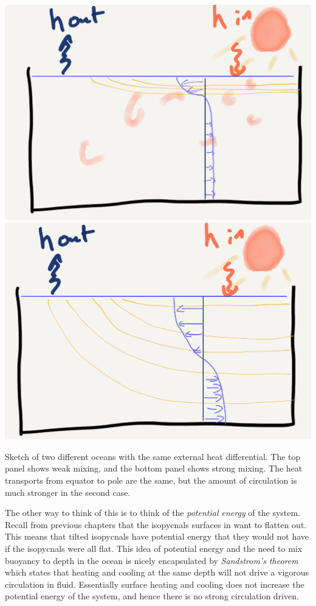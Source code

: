 \begin{marginfigure}
    \includegraphics{figs/WaterMasses/SketchWeakMix}
    \includegraphics{figs/WaterMasses/SketchStrongMix}
    \caption{Sketch of two different oceans with the same external heat differential.  The top panel shows weak mixing, and the bottom panel shows strong mixing.  The heat transports from equator to pole are the same, but the amount of circulation is much stronger in the second case.}
    \label{fig:SketchMixing}  
\end{marginfigure}

The other way to think of this is to think of the \emph{potential energy} of the system.  Recall from previous chapters that the isopycnals surfaces in  want to flatten out.  This means that tilted isopycnals have potential energy that they would not have if the isopycnals were all flat.  This idea of potential energy and the need to mix buoyancy to depth in the ocean is nicely encapsulated by \emph{Sandstrom's theorem} which states that heating and cooling at the same depth will not drive a vigorous circulation in fluid.  Essentially surface heating and cooling does not increase the potential energy of the system, and hence there is no strong circulation driven.

